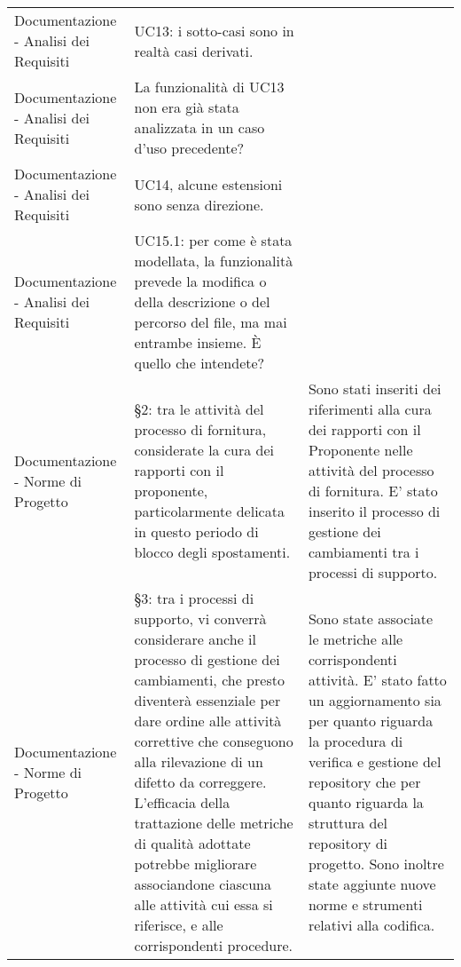 \begin{longtable}{ 
				>{\centering}p{} 
				>{\centering}p{}
				>{\centering\arraybackslash}p{}}
				Documentazione - Analisi dei Requisiti
					&
				UC13: i sotto-casi sono in realtà casi derivati.
					&

					\\
				
				Documentazione - Analisi dei Requisiti
					&
				La funzionalità di UC13 non era già stata analizzata in un caso d’uso precedente?
					&
	
					\\
			
				Documentazione - Analisi dei Requisiti
					&
				UC14, alcune estensioni sono senza direzione.
					&

					\\
			
				Documentazione - Analisi dei Requisiti
					&
				UC15.1: per come è stata modellata, la funzionalità prevede la modifica o della descrizione o del percorso del file, ma mai entrambe insieme. È quello che intendete?
					&

					\\
		 
				Documentazione - Norme di Progetto
					&
				 §2: tra le attività del processo di fornitura, considerate la cura dei rapporti con il proponente, particolarmente delicata in questo periodo di blocco degli spostamenti.
					&
				Sono stati inseriti dei riferimenti alla cura dei rapporti con il Proponente\ped{\textit{G}} nelle attività del processo di fornitura. E' stato inserito il processo di gestione dei cambiamenti tra i processi di supporto.
					\\
			
				Documentazione - Norme di Progetto
					&
				 §3: tra i processi di supporto, vi converrà considerare anche il processo di gestione dei cambiamenti, che presto diventerà essenziale per dare ordine alle attività correttive che conseguono alla rilevazione di un difetto da correggere. L’efficacia della trattazione delle metriche di qualità adottate potrebbe migliorare associandone ciascuna alle attività cui essa si riferisce, e alle corrispondenti procedure.
					&
				Sono state associate le metriche alle corrispondenti attività.
				E' stato fatto un aggiornamento sia per quanto riguarda la procedura di verifica e gestione del repository\ped{\textit{G}} che per quanto riguarda la struttura del repository\ped{\textit{G}} di progetto. Sono inoltre state aggiunte nuove norme e strumenti relativi alla codifica.
					\\
			 

\end{longtable}
